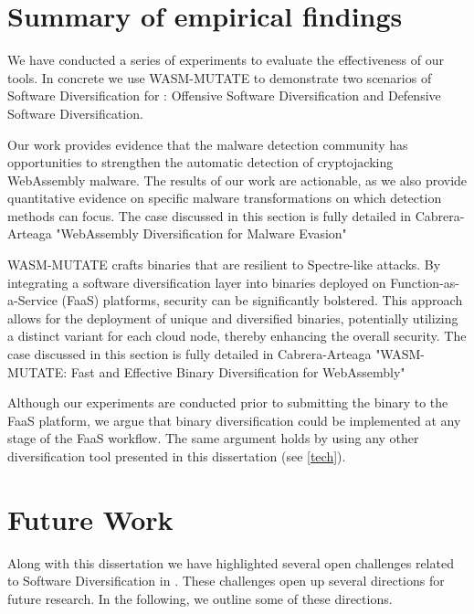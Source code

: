 

\section{Summary of empirical findings}

We have conducted a series of experiments to evaluate the effectiveness of our tools.
In concrete we use WASM-MUTATE to demonstrate two scenarios of Software Diversification for \Wasm: Offensive Software Diversification and Defensive Software Diversification.

Our work provides evidence that the malware detection community has opportunities to strengthen the automatic detection of cryptojacking WebAssembly malware. 
The results of our work are actionable, as we also provide quantitative evidence on specific malware transformations on which detection methods can focus. 
The case discussed in this section is fully detailed in Cabrera-Arteaga \etal "WebAssembly Diversification for Malware Evasion"

WASM-MUTATE crafts \Wasm binaries that are resilient to Spectre-like attacks. 
By integrating a software diversification layer into \Wasm binaries deployed on Function-as-a-Service (FaaS) platforms, security can be significantly bolstered. 
This approach allows for the deployment of unique and diversified \Wasm binaries, potentially utilizing a distinct variant for each cloud node, thereby enhancing the overall security.
The case discussed in this section is fully detailed in Cabrera-Arteaga \etal "WASM-MUTATE: Fast and Effective Binary Diversification for WebAssembly"




Although our experiments are conducted prior to submitting the \Wasm binary to the FaaS platform, we argue that \Wasm binary diversification could be implemented at any stage of the FaaS workflow.
The same argument holds by using any other diversification tool presented in this dissertation (see \autoref{tech}).


\section{Future Work}

Along with this dissertation we have highlighted several open challenges related to Software Diversification in \Wasm.
These challenges open up several directions for future research.
In the following, we outline some of these directions.

